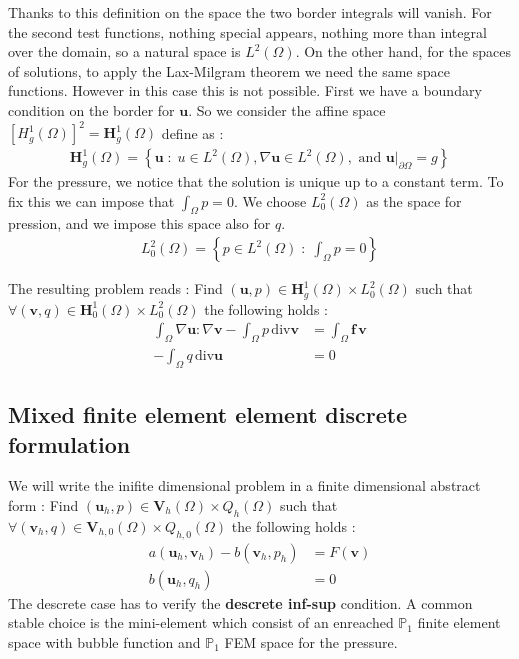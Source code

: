 \documentclass{article}
\begin{document}
Thanks to this definition on the space the two border integrals will vanish.
For the second test functions, nothing special appears, nothing more than
integral over the domain, so a natural space is $L^2(\Omega)$. 
On the other hand, for the spaces of solutions, to apply the Lax-Milgram theorem we need the
same space functions. However in this case this is not possible. First we have
a boundary condition on the border for $\mathbf{u}$. So we consider the affine
space $[H^1_g(\Omega)]^2=\mathbf{H}^1_g(\Omega)$ define as :
\begin{align*}
    \mathbf{H}^1_g(\Omega)=\left\{\mathbf{u} \;:\; u\in L^2(\Omega), \nabla \mathbf{u} \in L^2(\Omega), \textrm{ and } \mathbf{u}|_{\partial\Omega}=g \right\}
\end{align*}
For the pressure, we notice that the solution is unique up to a constant term.
To fix this we can impose that $\int_\Omega p =0$. We choose $L_0^2(\Omega)$ as
the space for pression, and we impose this space also for $q$.
\begin{align*}
    L^2_0(\Omega)=\left\{p\in L^2(\Omega)\; : \; \int_\Omega p =0\right\}
\end{align*}

The resulting problem reads :
Find $(\mathbf{u},p)\in \mathbf{H}^1_g(\Omega)\times L^2_0(\Omega)$ such that
$\forall (\mathbf{v},q)\in \mathbf{H}^1_0(\Omega)\times L^2_0(\Omega)$ the
following holds :
\begin{align}
	\label{weak_problem}
	\int_{\Omega} \nabla \mathbf{u} \mathbf{:} \nabla \mathbf{v}-\int_{\Omega} p\,
	\mathrm{div}\mathbf{v} &= \int_{\Omega}\mathbf{f}\, \mathbf{v} \\
	-\int_{\Omega} q\, \mathrm{div}\mathbf{u} &= 0 \nonumber
\end{align}

\subsection*{Mixed finite element element discrete formulation}
We will write the inifite dimensional problem in a finite dimensional
abstract form :
Find $(\mathbf{u}_h,p)\in \mathbf{V}_h(\Omega) \times Q_h(\Omega)$ such that
$\forall (\mathbf{v}_h,q)\in \mathbf{V}_{h,0}(\Omega) \times Q_{h,0}(\Omega)$ the
following holds :
\begin{align}
	\label{pert_problem}
	a(\mathbf{u}_h,\mathbf{v}_h) - b(\mathbf{v}_h,p_h) &= F(\mathbf{v}) \\
	b(\mathbf{u}_h, q_h) &= 0 \nonumber
\end{align}
The descrete case has to verify the \textbf{descrete inf-sup} condition. A
common stable choice is the mini-element which consist of an enreached
$\mathbb{P}_1$ finite element space with bubble function and
$\mathbb{P}_1$ FEM space for the pressure.
\end{document}
